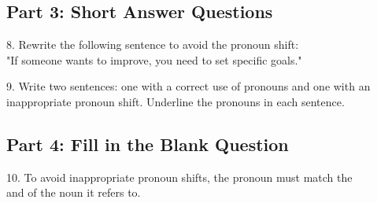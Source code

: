 \documentclass[12pt]{article}
\begin{document}
\vspace{1cm}

\subsection*{Part 3: Short Answer Questions}

8. Rewrite the following sentence to avoid the pronoun shift:  
\\"If someone wants to improve, you need to set specific goals."  
\vspace{3cm}

9. Write two sentences: one with a correct use of pronouns and one with an \\inappropriate pronoun shift. Underline the pronouns in each sentence.  
\vspace{5cm}

\subsection*{Part 4: Fill in the Blank Question}
\vspace{1cm}
10. To avoid inappropriate pronoun shifts, the pronoun must match the\\ \underline{\hspace{4cm}} and \underline{\hspace{4cm}} of the noun it refers to.  
\vspace{2cm}








\end{document}
